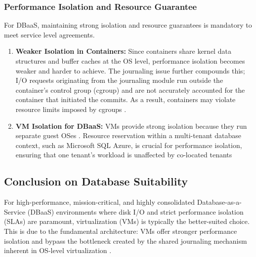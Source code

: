 

\subsubsection{Performance Isolation and Resource Guarantee}

For DBaaS, maintaining strong isolation and resource guarantees is mandatory to meet service level agreements.
\begin{enumerate}
    \item \textbf{Weaker Isolation in Containers:} Since containers share kernel data structures and buffer caches at the OS level, performance isolation becomes weaker and harder to achieve. The journaling issue further compounds this; I/O requests originating from the journaling module run outside the container's control group (cgroup) and are not accurately accounted for the container that initiated the commits. As a result, containers may violate resource limits imposed by cgroups \cite{Containers_or_Hypervisors_Which_is_Better_for_Database_Consolidation}.

    \item \textbf{VM Isolation for DBaaS:} VMs provide strong isolation because they run separate guest OSes \cite{Containers_or_Hypervisors_Which_is_Better_for_Database_Consolidation}. Resource reservation within a multi-tenant database context, such as Microsoft SQL Azure, is crucial for performance isolation, ensuring that one tenant's workload is unaffected by co-located tenants \cite{Performance_Isolation_in_MultTenant_Relational_Database_as_a_Service}
\end{enumerate}

\subsection{Conclusion on Database Suitability}
For high-performance, mission-critical, and highly consolidated Database-as-a-Service (DBaaS) environments where disk I/O and strict performance isolation (SLAs) are paramount, virtualization (VMs) is typically the better-suited choice. This is due to the fundamental architecture: VMs offer stronger performance isolation and bypass the bottleneck created by the shared journaling mechanism inherent in OS-level virtualization \cite{Emerging_Trends_Techniques_and_Open_Issues_of_Containerization_A_Review}. 

